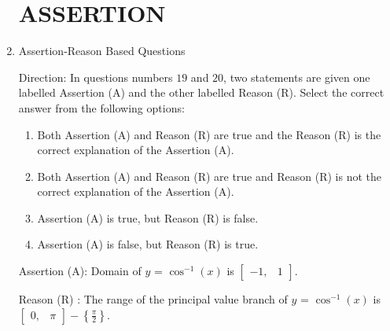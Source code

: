 \documentclass{article}
\providecommand{\myvec}[1]{\ensuremath{\begin{bmatrix}#1\end{bmatrix}}}
\providecommand{\cbrak}[1]{\ensuremath{\left\{#1\right\}}}
\providecommand{\brak}[1]{\ensuremath{\left(#1\right)}}
\begin{document}
						\begin{enumerate}
						\section{ASSERTION}
\item Assertion-Reason Based Questions

Direction: In questions numbers $19$ and $20$, two statements are given one labelled Assertion (A) and the other labelled Reason (R). Select the correct answer from the following options:
                \begin{enumerate}
\item Both Assertion (A) and Reason (R) are true and the Reason (R) is the correct explanation of the Assertion (A).
\item Both Assertion (A) and Reason (R) are true and Reason (R) is not the correct explanation of the Assertion (A).
\item Assertion (A) is true, but Reason (R) is false.
\item Assertion (A) is false, but Reason (R) is true.
                \end{enumerate}
								Assertion (A): Domain of $y$ = $\cos^{-1}\brak{x}$ is $\myvec{-1,& 1}$.

								Reason (R) : The range of the principal value branch of $y$ = $\cos^{-1}\brak{x}$ is $\myvec{0,& \pi}-\cbrak{\frac{\pi}{2}}$.
\end{enumerate}
\end{document}
